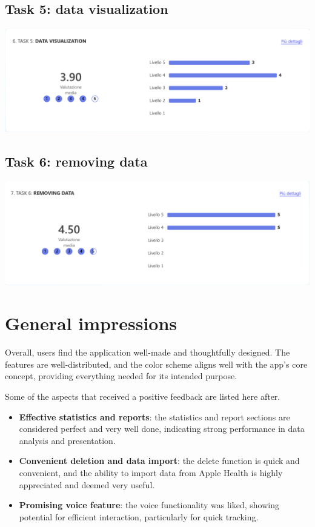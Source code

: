 \documentclass{article}
\begin{document}
\subsection{Task 5: data visualization}

\begin{center}
	\includegraphics[width=\linewidth]{images/data-visualization-result.png}
\end{center}

\subsection{Task 6: removing data}

\begin{center}
	\includegraphics[width=\linewidth]{images/removing-data-result.png}
\end{center}

\section{General impressions}

Overall, users find the application well-made and thoughtfully designed.
The features are well-distributed, and the color scheme aligns well with the app's core concept, providing everything needed for its intended purpose.

Some of the aspects that received a positive feedback are listed here after.

\begin{itemize}
	\item \textbf{Effective statistics and reports}: the statistics and report sections are considered perfect and very well done, indicating strong performance in data analysis and presentation.
	\item \textbf{Convenient deletion and data import}: the delete function is quick and convenient, and the ability to import data from Apple Health is highly appreciated and deemed very useful.
	\item \textbf{Promising voice feature}: the voice functionality was liked, showing potential for efficient interaction, particularly for quick tracking.
\end{itemize}
\end{document}
